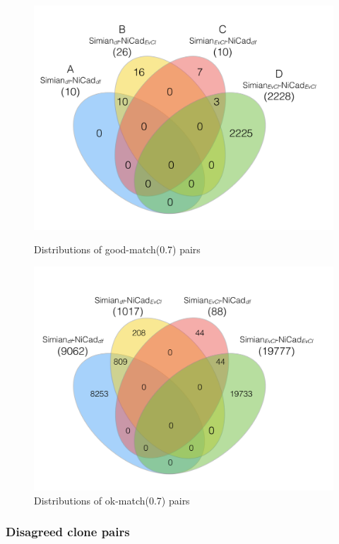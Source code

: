 \documentclass{sig-alternate-05-2015}
\begin{document}
\begin{figure}
	\begin{minipage}{.5\textwidth}
		\centering
		\includegraphics[width=0.8\linewidth]{venn4_pairs_good_pt1+2}
		\caption{Distributions of good-match(0.7) pairs}
		\label{fig:venn4_orig_good}
	\end{minipage}
	\begin{minipage}{.5\textwidth}
		\centering
		\includegraphics[width=0.8\linewidth]{venn4_pairs_ok_pt1+2+3}
		\caption{Distributions of ok-match(0.7) pairs}
		\label{fig:venn4_orig_ok}
	\end{minipage}
\end{figure}

\subsubsection{Disagreed clone pairs}
\end{document}
